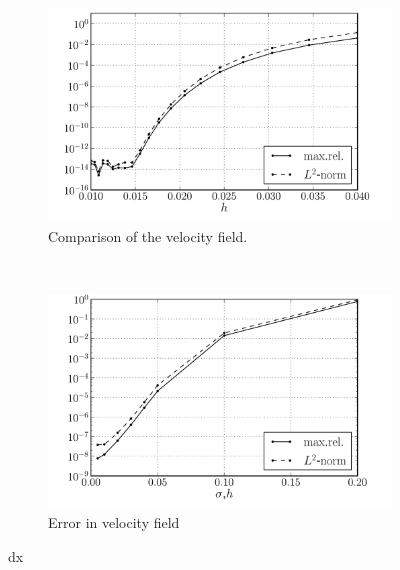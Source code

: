	\begin{figure}[p]
	        \centering
	        \begin{subfigure}[b]{0.5\textwidth}
	                \includegraphics[width=\textwidth]{figures/lagrangian/lambOseen_convergence_dx_sigma0p02_compressed.pdf}
	                \caption{Comparison of the velocity field.}
	                \label{fig:lambOseen_convergence_dx_sigma0p02_compressed}
	        \end{subfigure}%
	        ~ %
	        \begin{subfigure}[b]{0.5\textwidth}
	                \includegraphics[width=\textwidth]{figures/lagrangian/lambOseen_convergence_dx_compressed.pdf}
	                \caption{Error in velocity field}
	                \label{fig:lambOseen_convergence_dx_compressed}
	        \end{subfigure}
	        \caption{dx}
	        \label{fig:lambOseen_convergence_dx}
	\end{figure}	

